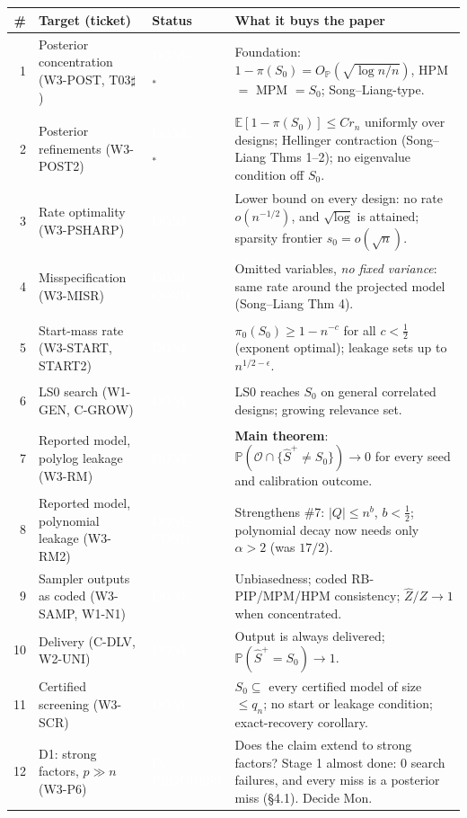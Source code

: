 \documentclass[11pt,a4paper]{article}
\newcommand{\badge}[2]{\colorbox{#1}{\textcolor{white}{\sffamily\scriptsize\bfseries\strut #2}}}
\newcommand{\DONE}{\badge{done}{DONE}}
\newcommand{\DONEC}{\badge{cond}{DONE-COND}}
\newcommand{\PROG}{\badge{prog}{IN PROGRESS}}
\newcommand{\Szero}{S_0}
\newcommand{\Shat}{\hat S^{+}}
\newcommand{\Out}{\mathcal{O}}
\newcommand{\rn}{r_n}
\newcommand{\Prob}{\mathbb{P}}
\newcommand{\E}{\mathbb{E}}
\newcommand{\OP}{O_{\mathbb{P}}}
\theoremstyle{definition}
\begin{document}
\smallskip
{\footnotesize
\renewcommand{\arraystretch}{1.08}
\begin{tabularx}{\linewidth}{@{}r >{\raggedright\arraybackslash}p{4.6cm} l >{\raggedright\arraybackslash}X@{}}
\toprule
\# & Target (ticket) & Status & What it buys the paper\\
\midrule
1 & Posterior concentration (W3-POST, T03$\sharp$) & \DONE$^{\ast}$ & Foundation: $1-\pi(\Szero)=\OP(\sqrt{\log n/n})$, HPM $=$ MPM $=\Szero$; Song--Liang-type.\\
2 & Posterior refinements (W3-POST2) & \DONE$^{\ast}$ & $\E[1-\pi(\Szero)]\le C\rn$ uniformly over designs; Hellinger contraction (Song--Liang Thms 1--2); no eigenvalue condition off $\Szero$.\\
3 & Rate optimality (W3-PSHARP) & \DONE & Lower bound on every design: no rate $o(n^{-1/2})$, and $\sqrt{\log}$ is attained; sparsity frontier $s_0=o(\sqrt n)$.\\
4 & Misspecification (W3-MISR) & \DONEC & Omitted variables, \emph{no fixed variance}: same rate around the projected model (Song--Liang Thm 4).\\
5 & Start-mass rate (W3-START, START2) & \DONE & $\pi_0(\Szero)\ge 1-n^{-c}$ for all $c<\tfrac12$ (exponent optimal); leakage sets up to $n^{1/2-\epsilon}$.\\
6 & LS0 search (W1-GEN, C-GROW) & \DONE & LS0 reaches $\Szero$ on general correlated designs; growing relevance set.\\
7 & Reported model, polylog leakage (W3-RM) & \DONE & \textbf{Main theorem}: $\Prob(\Out\cap\{\Shat\neq\Szero\})\to0$ for every seed and calibration outcome.\\
8 & Reported model, polynomial leakage (W3-RM2) & \DONEC & Strengthens \#7: $|Q|\le n^{b}$, $b<\tfrac12$; polynomial decay now needs only $\alpha>2$ (was $17/2$).\\
9 & Sampler outputs as coded (W3-SAMP, W1-N1) & \DONE & Unbiasedness; coded RB-PIP/MPM/HPM consistency; $\hat Z/Z\to1$ when concentrated.\\
10 & Delivery (C-DLV, W2-UNI) & \DONE & Output is always delivered; $\Prob(\Shat=\Szero)\to1$.\\
11 & Certified screening (W3-SCR) & \DONE & $\Szero\subseteq$ every certified model of size $\le q_n$; no start or leakage condition; exact-recovery corollary.\\
\midrule
12 & D1: strong factors, $p\gg n$ (W3-P6) & \PROG & Does the claim extend to strong factors? Stage 1 almost done: 0 search failures, and every miss is a posterior miss (\S4.1). Decide Mon.\\

\end{tabularx}}
\end{document}
